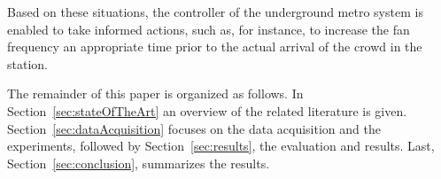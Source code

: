 Based on these situations, the controller of the underground metro system is enabled to take informed actions, such as, for instance, to increase the fan frequency an appropriate time prior to the actual arrival of the crowd in the station.


The remainder of this paper is organized as follows. In Section~\ref{sec:stateOfTheArt} an overview of the related literature is given. Section~\ref{sec:dataAcquisition} focuses on the data acquisition and the experiments, followed by Section~\ref{sec:results}, the evaluation and results. Last, Section~\ref{sec:conclusion}, summarizes the results.


